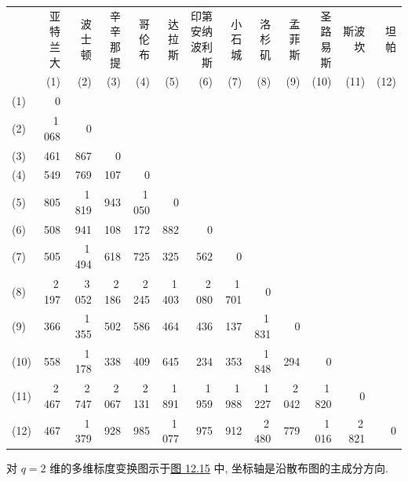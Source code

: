 
\begin{mvtable}
\label{tab:12.7}
\setlength{\tabcolsep}{3.2pt}%
%
\begin{tabular}{l*{12}{r}}
\toprule
& \makecell{亚特\\兰大} & 波士顿 & \makecell{辛辛\\那提} & \makecell{哥伦\\布} & \makecell{达拉\\斯} & \makecell{印第安纳\\波利斯} & \makecell{小石\\城} & \makecell{洛杉\\矶} & \makecell{孟菲\\斯} & \makecell{圣路\\易斯} & 斯波坎 & 坦帕 \\
& (1) & (2) & (3) & (4) & (5) & (6) & (7) & (8) & (9) & (10) & (11) & (12) \\
\midrule
(1)  & 0 & & & & & & & & & & & \\
(2)  & 1\,068 & 0 & & & & & & & & & & \\
(3)  & 461 & 867 & 0 & & & & & & & & & \\
(4)  & 549 & 769 & 107 & 0 & & & & & & & & \\
(5)  & 805 & 1\,819 & 943 & 1\,050 & 0 & & & & & & & \\
(6)  & 508 & 941 & 108 & 172 & 882 & 0 & & & & & & \\
(7)  & 505 & 1\,494 & 618 & 725 & 325 & 562 & 0 & & & & & \\
(8)  & 2\,197 & 3\,052 & 2\,186 & 2\,245 & 1\,403 & 2\,080 & 1\,701 & 0 & & & & \\
(9)  & 366 & 1\,355 & 502 & 586 & 464 & 436 & 137 & 1\,831 & 0 & & & \\
(10) & 558 & 1\,178 & 338 & 409 & 645 & 234 & 353 & 1\,848 & 294 & 0 & & \\
(11) & 2\,467 & 2\,747 & 2\,067 & 2\,131 & 1\,891 & 1\,959 & 1\,988 & 1\,227 & 2\,042 & 1\,820 & 0 & \\
(12) & 467 & 1\,379 & 928 & 985 & 1\,077 & 975 & 912 & 2\,480 & 779 & 1\,016 & 2\,821 & 0 \\
\bottomrule
\end{tabular}
\end{mvtable}

对 $q=2$ 维的多维标度变换图示于\hyperref[fig:12.15]{图 12.15} 中, 坐标轴是沿散布图的主成分方向.

